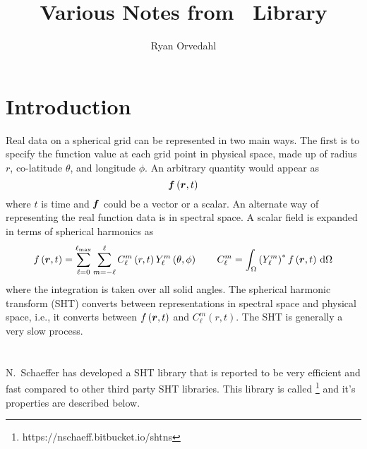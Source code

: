 \documentclass[10pt,letterpaper]{article}
\begin{document}
\title{Various Notes from \shtns\ Library}
\author{Ryan Orvedahl}

\maketitle

\section{Introduction}
Real data on a spherical grid can be represented in two main ways. The first
is to specify the function value at each grid point in physical space,
made up of radius $r$, co-latitude $\theta$, and longitude $\phi$. An arbitrary
quantity would appear as
\begin{equation}
 \bm{f}\left(\bm{r},t\right)
\end{equation}
where $t$ is time and $\bm{f}$ could be a vector or a scalar.
An alternate way of representing the real function data is in spectral space.
A scalar field is expanded in terms of spherical harmonics as
\begin{equation}
 f\left(\bm{r},t\right) = \sum\limits_{\ell=0}^{\ell_\mathrm{max}}
                                 \sum\limits_{m=-\ell}^{\ell}
                C_\ell^m\left(r,t\right) Y_\ell^m\left(\theta,\phi\right)
\qquad
C_\ell^m = \int_\Omega \left(Y_\ell^m\right)^* f\left(\bm{r},t\right)
           \,\mathrm{d}\Omega
\end{equation}
where the integration is taken over all solid angles. The spherical harmonic
transform (SHT) converts between representations in spectral space and
physical space, i.e., it converts between $f\left(\bm{r},t\right)$
and $C_\ell^m\left(r,t\right)$. The SHT is generally a very slow process.

\section{\shtns}
N.~Schaeffer has developed a SHT library that is reported to be very efficient
and fast compared to other third party SHT libraries. This library is called
\shtns\footnote{https://nschaeff.bitbucket.io/shtns} and it's properties are
described below.
\end{document}
